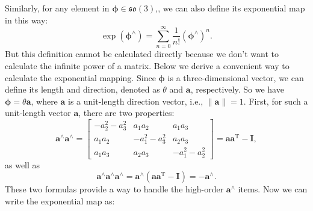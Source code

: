 Similarly, for any element in $\boldsymbol{\phi} \in \mathfrak{so}(3)$,, we can also define its exponential map in this way:
\begin{equation}
\exp(\boldsymbol{\phi}^\wedge) = \sum\limits_{n = 0}^\infty {\frac{1}{{n!}}{ (\boldsymbol{\phi}^{\wedge })^n}}.
\end{equation}
But this definition cannot be calculated directly because we don't want to calculate the infinite power of a matrix. Below we derive a convenient way to calculate the exponential mapping. Since $\boldsymbol{\phi}$ is a three-dimensional vector, we can define its length and direction,  denoted as $\theta$ and $\mathbf{a}$, respectively. So we have $\boldsymbol{\phi} = \theta \mathbf{a}$, where $\mathbf{a}$ is a unit-length direction vector, i.e., $\| \mathbf{a} \| =1$. First, for such a unit-length vector $\mathbf{a}$, there are two properties:
\begin{equation}
 \mathbf{a}^{\wedge} \mathbf{a}^{\wedge} = \left[ {\begin{array}{*{20}{c}}
{ - a_2^2 - a_3^2}&{{a_1}{a_2}}&{{a_1}{a_3}}\\
{{a_1}{a_2}}&{ - a_1^2 - a_3^2}&{{a_2}{a_3}}\\
{{a_1}{a_3}}&{{a_2}{a_3}}&{ - a_1^2 - a_2^2}
\end{array}} \right] = \mathbf{a} \mathbf{a}^\mathrm{T} - \mathbf{I},
\end{equation}
as well as
\begin{equation}
\mathbf{a}^{\wedge} \mathbf{a}^{\wedge} \mathbf{a}^{\wedge} = \mathbf{a}^\wedge (\mathbf{a}\mathbf{a} ^\mathrm{T}-\mathbf{I}) = - \mathbf{a}^{\wedge}.
\end{equation}
These two formulas provide a way to handle the high-order $\mathbf{a}^\wedge$ items. Now we can write the exponential map as:
